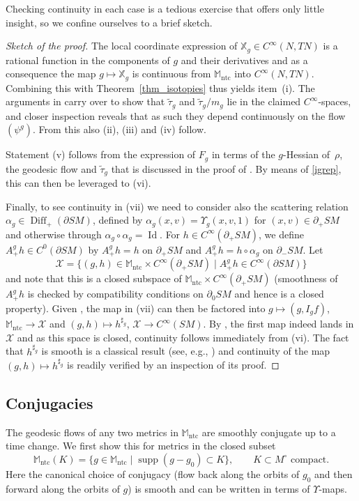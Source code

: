 \documentclass[10pt,a4paper]{amsart}
\numberwithin{equation}{section}
\theoremstyle{definition}
\newcommand{\M}{\mathbb{M}}
\newcommand{\1}{{\bf 1}}
\DeclareMathOperator{\supp}{supp}
\newcommand{\Id}{\operatorname{Id}}
\newcommand{\ntc}{\mathrm{ntc}}
\DeclareMathOperator{\Diff}{Diff}
\begin{document}
Checking continuity in each case is a tedious exercise that offers only little insight, so we confine ourselves to a brief sketch.

\begin{proof}[Sketch of the proof] The local coordinate expression of $\mathbb X_g\in C^\infty(N,TN)$ is a rational function in the components of $g$ and their derivatives and as a consequence the map $g\mapsto \mathbb X_g$ is continuous from $\M_\ntc$ into $C^\infty(N,TN)$. Combining this with Theorem~\ref{thm_isotopies} thus yields item~(i).
The arguments in \cite[Section~3.2]{PSU23} carry over to show that $\tilde \tau_g$ and $\tilde \tau_g/m_g$ lie in the claimed $C^\infty$-spaces, and closer inspection reveals that as such they depend continuously on the flow~$(\psi^g)$. From this also (ii), (iii) and (iv) follow.

Statement (v) follows from the expression of $F_g$ in terms of the $g$-Hessian of~$\rho$, the geodesic flow and $\tilde \tau_g$ that is discussed in the proof of \cite[Proposition~6.12]{MNP20}. By means of \eqref{igrep}, this can then be leveraged to (vi).

Finally, to see continuity in (vii) we need to consider also the scattering relation $\alpha_g\in \Diff_+(\partial SM)$, defined by $\alpha_g(x,v)=\Upsilon_g(x,v,1)$ for $(x,v)\in \partial_+SM$ and otherwise through $\alpha_g\circ \alpha_g = \Id$. For $h\in C^\infty(\partial_+SM)$, we define $A_+^gh\in C^0(\partial SM)$ by $A^g_+h = h$ on $\partial_+SM$ and $A_+^g h = h\circ \alpha_g$ on $\partial_-SM$. Let
\[
	\mathcal X = \{(g,h)\in \M_\ntc \times C^\infty(\partial_+SM)\mid A_+^g h \in C^\infty(\partial SM)\}
\]
and note that this is a closed subspace of $\M_\ntc\times C^\infty(\partial_+SM)$ (smoothness of $A_+^g h$ is checked by compatibility conditions on $\partial_0SM$ and hence is a closed property). Given , the map in (vii) can then be factored into
$g\mapsto (g,I_g f)$, $\M_\ntc \rightarrow \mathcal X$ and $ (g,h)\mapsto h^{\sharp_g}$, $\mathcal X\rightarrow C^\infty(SM)$.
By \cite[Proposition 6.13]{MNP20}, the first map indeed lands in $\mathcal X$ and as this space is closed, continuity follows immediately from (vi). The fact that $h^{\sharp_g}$ is smooth is a classical result (see, e.g., \cite[Theorem 5.1.1]{PSU23}) and continuity of the map $(g,h)\mapsto h^{\sharp_g}$ is readily verified by an inspection of its proof.
\end{proof}


\subsection{Conjugacies} The geodesic flows of any two metrics in $\M_\ntc$ are smoothly conjugate up to a time change. We first show this for metrics in the closed subset
\begin{equation}\label{def_mntck}
	\M_\ntc(K) = \{g\in \M_\ntc\mid \supp(g-g_0)\subset K\},\qquad K\subset M^\circ \text{ compact}.
\end{equation}
Here the canonical choice of conjugacy (flow back along the orbits of $g_0$ and then forward along the orbits of $g$) is smooth and can be written in terms of $\Upsilon$-maps.
\end{document}
